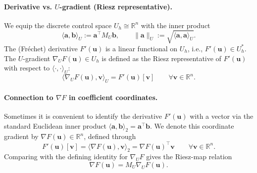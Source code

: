 \documentclass[11pt,a4paper]{article}
\begin{document}
\paragraph{Derivative vs. $U$-gradient (Riesz representative).}
We equip the discrete control space $U_h\cong\mathbb{R}^n$ with the inner product
\begin{equation}
  \langle \mathbf{a},\mathbf{b} \rangle_U := \mathbf{a}^\top M_U\mathbf{b},
  \qquad \|\mathbf{a}\|_U := \sqrt{\langle \mathbf{a},\mathbf{a} \rangle_U}.
\end{equation}
The (Fr\'echet) derivative $F'(\mathbf{u})$ is a linear functional on $U_h$, i.e., $F'(\mathbf{u})\in U_h^*$. The $U$-gradient
\(\nabla_U F(\mathbf{u})\in U_h\) is defined as the Riesz representative of $F'(\mathbf{u})$ with respect to $\langle\cdot,\cdot\rangle_U$:
\begin{equation}
  \langle \nabla_U F(\mathbf{u}),\mathbf{v} \rangle_U = F'(\mathbf{u})[\mathbf{v}] \qquad \forall \mathbf{v}\in\mathbb{R}^n.
\end{equation}

\paragraph{Connection to $\nabla F$ in coefficient coordinates.}
Sometimes it is convenient to identify the derivative $F'(\mathbf{u})$ with a vector via the standard Euclidean inner product $\langle \mathbf{a},\mathbf{b}\rangle_2=\mathbf{a}^\top\mathbf{b}$. We denote this coordinate gradient by $\nabla F(\mathbf{u})\in\mathbb{R}^n$, defined through
\begin{equation}
  F'(\mathbf{u})[\mathbf{v}] = \langle \nabla F(\mathbf{u}),\mathbf{v} \rangle_2 = \nabla F(\mathbf{u})^\top \mathbf{v} \qquad \forall \mathbf{v}\in\mathbb{R}^n.
\end{equation}
Comparing with the defining identity for $\nabla_U F$ gives the Riesz-map relation
\begin{equation}
  \nabla F(\mathbf{u}) = M_U\nabla_U F(\mathbf{u}).
\end{equation}
\end{document}
